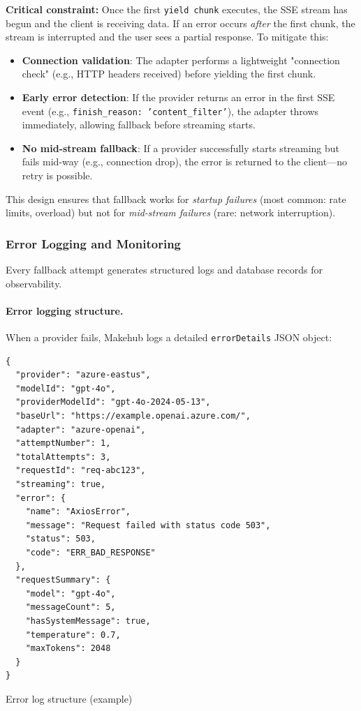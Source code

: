 \documentclass[english]{article}
\begin{document}
\textbf{Critical constraint:} Once the first \texttt{yield chunk} executes, the SSE stream has begun and the client is receiving data. If an error occurs \emph{after} the first chunk, the stream is interrupted and the user sees a partial response. To mitigate this:

\begin{itemize}
    \item \textbf{Connection validation}: The adapter performs a lightweight "connection check" (e.g., HTTP headers received) before yielding the first chunk.
    \item \textbf{Early error detection}: If the provider returns an error in the first SSE event (e.g., \texttt{finish\_reason: 'content\_filter'}), the adapter throws immediately, allowing fallback before streaming starts.
    \item \textbf{No mid-stream fallback}: If a provider successfully starts streaming but fails mid-way (e.g., connection drop), the error is returned to the client—no retry is possible.
\end{itemize}

This design ensures that fallback works for \emph{startup failures} (most common: rate limits, overload) but not for \emph{mid-stream failures} (rare: network interruption).

\subsubsection{Error Logging and Monitoring}

Every fallback attempt generates structured logs and database records for observability.

\paragraph{Error logging structure.}

When a provider fails, Makehub logs a detailed \texttt{errorDetails} JSON object:

\begin{listing}[H]
\begin{verbatim}
{
  "provider": "azure-eastus",
  "modelId": "gpt-4o",
  "providerModelId": "gpt-4o-2024-05-13",
  "baseUrl": "https://example.openai.azure.com/",
  "adapter": "azure-openai",
  "attemptNumber": 1,
  "totalAttempts": 3,
  "requestId": "req-abc123",
  "streaming": true,
  "error": {
    "name": "AxiosError",
    "message": "Request failed with status code 503",
    "status": 503,
    "code": "ERR_BAD_RESPONSE"
  },
  "requestSummary": {
    "model": "gpt-4o",
    "messageCount": 5,
    "hasSystemMessage": true,
    "temperature": 0.7,
    "maxTokens": 2048
  }
}
\end{verbatim}
\caption{Error log structure (example)}
\end{listing}
\end{document}
